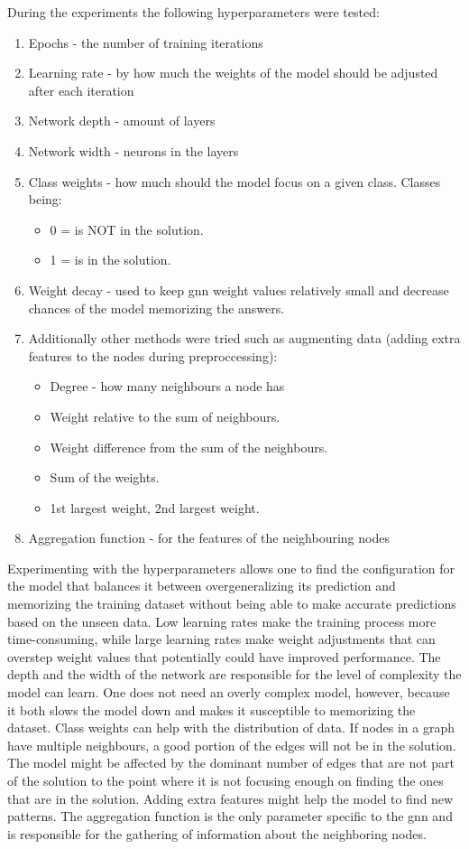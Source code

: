 During the experiments the following hyperparameters were tested:
\begin{enumerate}
\item Epochs - the number of training iterations
\item Learning rate - by how much the weights of the model should be adjusted after each iteration
\item Network depth - amount of layers 
\item Network width - neurons in the layers
\item Class weights - how much should the model focus on a given class. Classes being: 
	\begin{itemize}
	\item 0 = is NOT in the solution.
	\item 1 = is in the solution.
	\end{itemize}	
\item Weight decay - used to keep \gls{gnn} weight values relatively small and decrease chances of the model memorizing the answers. 

\item Additionally other methods were tried such as augmenting data (adding extra features to the nodes during preproccessing): 
	\begin{itemize}
	\item Degree - how many neighbours a node has
	\item Weight relative to the sum of neighbours.
	\item Weight difference from the sum of the neighbours.
	\item Sum of the weights. 
	\item 1st largest weight, 2nd largest weight.
	\end{itemize}

\item Aggregation function - for the features of the neighbouring nodes 
\end{enumerate}

Experimenting with the hyperparameters allows one to find the configuration for the model that balances it between overgeneralizing its prediction and memorizing the training dataset without being able to make accurate predictions based on the unseen data. Low learning rates make the training process more time-consuming, while large learning rates make weight adjustments that can overstep weight values that potentially could have improved performance. The depth and the width of the network are responsible for the level of complexity the model can learn. One does not need an overly complex model, however, because it both slows the model down and makes it susceptible to memorizing the dataset. Class weights can help with the distribution of data. If nodes in a graph have multiple neighbours, a good portion of the edges will not be in the solution. The model might be affected by the dominant number of edges that are not part of the solution to the point where it is not focusing enough on finding the ones that are in the solution. Adding extra features might help the model to find new patterns. The aggregation function is the only parameter specific to the \gls{gnn} and is responsible for the gathering of information about the neighboring nodes.

